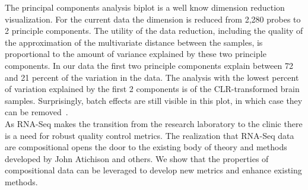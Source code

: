 \documentclass{article}\usepackage[]{graphicx}\usepackage[]{color}
\theoremstyle{definition}
\begin{document}
The principal components analysis biplot is a well know dimension reduction visualization.  For the current data the dimension is reduced from 2,280 probes to 2 principle components.  The utility of the data reduction, including the quality of the approximation of the multivariate distance between the samples, is proportional to the amount of variance explained by these two principle components. In our data the first two principle components explain between 72 and 21 percent of the variation in the data.  The analysis with the lowest percent of variation explained by the first 2 components is of the CLR-transformed brain samples.  Surprisingly, batch effects are still visible in this plot, in which case they can be removed~\cite{Luo2010}.  \\

As RNA-Seq makes the transition from the research laboratory to the clinic there is a need for robust quality control metrics.  The realization that RNA-Seq data are compositional opens the door to the existing body of theory and methods developed by John Atichison and others.  We show that the properties of compositional data can be leveraged to develop new metrics and enhance existing methods.\\


\newpage
\printbibliography
\end{document}

